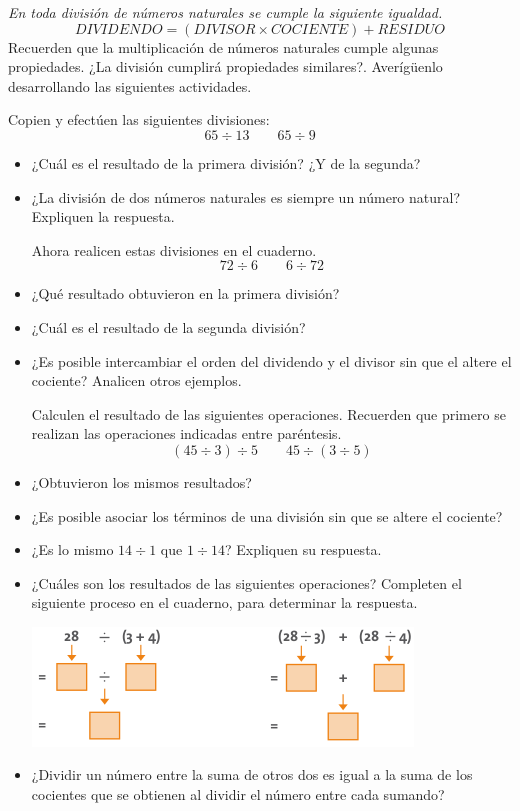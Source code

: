 \documentclass[letterpaper,11pt,twoside]{article}
\begin{document}
\begin{multicols}{2}
\emph{En toda división de números naturales se cumple
la siguiente igualdad.}
\[DIVIDENDO=(DIVISOR\times COCIENTE)+RESIDUO\]
Recuerden que la multiplicación de números naturales
cumple algunas propiedades. ¿La división cumplirá propiedades similares?. Averígüenlo desarrollando las siguientes actividades.

Copien y efectúen las siguientes divisiones:
\[65\div 13 \qquad 65\div 9\]
\begin{itemize}
\item ¿Cuál es el resultado de la primera división? ¿Y de la segunda?
\item ¿La división de dos números naturales es siempre un número natural? Expliquen la respuesta.

Ahora realicen estas divisiones en el cuaderno.
\[72\div 6 \qquad 6\div 72\]
\item ¿Qué resultado obtuvieron en la primera división?
\item ¿Cuál es el resultado de la segunda división?
\item ¿Es posible intercambiar el orden del dividendo y el divisor sin que el altere el cociente? Analicen otros ejemplos.

Calculen el resultado de las siguientes operaciones. Recuerden que primero se realizan las operaciones indicadas entre paréntesis.
\[(45\div 3)\div 5\qquad 45\div (3\div 5) \]
\item ¿Obtuvieron los mismos resultados?
\item ¿Es posible asociar los términos de una división sin que se altere el cociente?
\item ¿Es lo mismo $14 \div 1$ que $1 \div 14$? Expliquen su respuesta.
\item ¿Cuáles son los resultados de las siguientes
operaciones? Completen el siguiente proceso en el
cuaderno, para determinar la respuesta.
\begin{center}
\includegraphics[scale=.55]{Images/divisiones.png} 
\end{center}
\item ¿Dividir un número entre la suma de otros dos es igual a la suma de los cocientes que se obtienen al dividir el número entre cada sumando?
\end{itemize}

\end{multicols}
\end{document}
